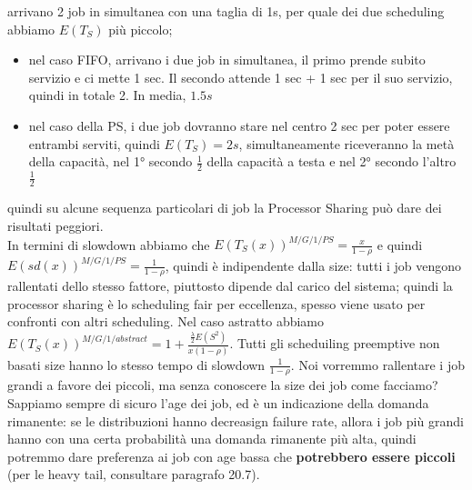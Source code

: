 \documentclass{article}
\begin{document}
arrivano 2 job in simultanea con una taglia di 1s, per quale dei due scheduling abbiamo $E(T_S)$ più piccolo;
\begin{itemize}
\item nel caso FIFO, arrivano i due job in simultanea, il primo prende subito servizio e ci mette 1 sec. Il secondo attende 1 sec + 1 sec per il suo servizio, quindi in totale 2. In media, $1.5 s$
\item nel caso della PS, i due job dovranno stare nel centro 2 sec per poter essere entrambi serviti, quindi $E(T_S) = 2 s$, simultaneamente riceveranno la metà della capacità, nel 1° secondo $\frac{1}{2}$ della capacità a testa e nel 2° secondo l'altro $\frac{1}{2}$
\end{itemize}
quindi su alcune sequenza particolari di job la Processor Sharing può dare dei risultati peggiori.\\ In termini di slowdown abbiamo che $E(T_S(x))^{M/G/1/PS} = \frac{x}{1 - \rho}$ e quindi $E(sd(x))^{M/G/1/PS} = \frac{1}{1 - \rho}$, quindi è indipendente dalla size: tutti i job vengono rallentati dello stesso fattore, piuttosto dipende dal carico del sistema; quindi la processor sharing è lo scheduling fair per eccellenza, spesso viene usato per confronti con altri scheduling. Nel caso astratto abbiamo $E(T_S(x))^{M/G/1/abstract} = 1 + \frac{\frac{\lambda}{2}E(S^2)}{x(1 - \rho)}$. Tutti gli scheduiling preemptive non basati size hanno lo stesso tempo di slowdown $\frac{1}{1 - \rho}$. Noi vorremmo rallentare i job grandi a favore dei piccoli, ma senza conoscere la size dei job come facciamo? Sappiamo sempre di sicuro l'age dei job, ed è un indicazione della domanda rimanente: se le distribuzioni hanno decreasign failure rate, allora i job più grandi hanno con una certa probabilità una domanda rimanente più alta, quindi potremmo dare preferenza ai job con age bassa che \textbf{potrebbero essere piccoli} (per le heavy tail, consultare paragrafo 20.7).
\end{document}
